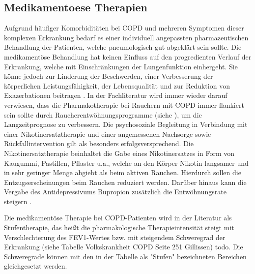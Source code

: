 \subsection{Medikamentoese Therapien}
\label{medikamentoese therapien}
Aufgrund häufiger Komorbiditäten bei COPD und mehreren Symptomen dieser komplexen Erkrankung bedarf es einer individuell angepassten pharmazeutischen Behandlung der Patienten, welche pneumologisch gut abgeklärt sein sollte. Die medikamentöse Behandlung hat keinen Einfluss auf den progredienten Verlauf der Erkrankung, welche mit Einschränkungen der Lungenfunktion einhergeht. Sie könne jedoch zur Linderung der Beschwerden, einer Verbesserung der körperlichen Leistungsfähigkeit, der Lebensqualität und zur Reduktion von Exazerbationen beitragen \autocite[vgl.][249]{gillissen2007}. In der Fachliteratur wird immer wieder darauf verwiesen, dass die Pharmakotherapie bei Rauchern mit COPD immer flankiert sein sollte durch Raucherentwöhnungsprogramme (siehe \label{nicht-medikamentoese therapien}), um die Langzeitprognose zu verbessern. Die psychosoziale Begleitung in Verbindung mit einer Nikotinersatztherapie und einer angemessenen Nachsorge sowie Rückfallintervention gilt als besonders erfolgsversprechend. Die Nikotinersatztherapie beinhaltet die Gabe eines Nikotinersatzes in Form von Kaugummi, Pastillen, Pflaster u.a., welche an den Körper Nikotin langsamer und in sehr geringer Menge abgiebt als beim aktiven Rauchen. Hierdurch sollen die Entzugserscheinungen beim Rauchen reduziert werden. Darüber hinaus kann die Vergabe des Antidepressivums Bupropion zusätzlich die Entwöhnungsrate steigern \autocite[vgl.][e12]{vogelmeier2007}.

Die medikamentöse Therapie bei COPD-Patienten wird in der Literatur als Stufentherapie, das heißt die pharmakologische Therapieintensität steigt mit Verschlechterung des FEV1-Wertes bzw. mit steigendem Schweregrad der Erkrankung (siehe Tabelle Volkskrankheit COPD Seite 251 Gillissen) todo. Die Schweregrade können mit den in der Tabelle als "Stufen" bezeichneten Bereichen gleichgesetzt werden.



